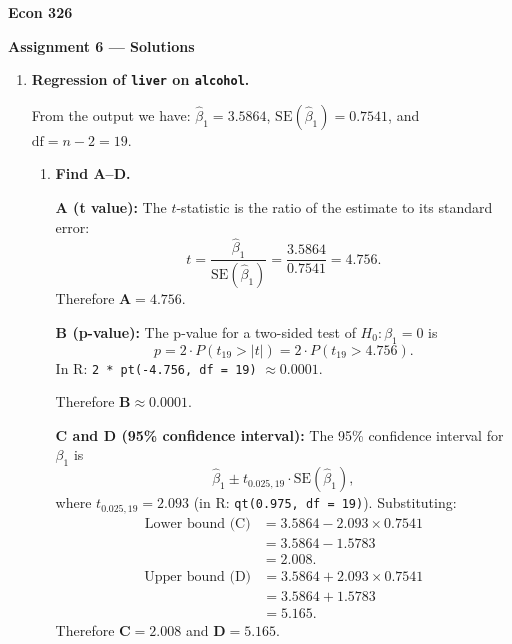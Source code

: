 \documentclass[12pt]{article}
\begin{document}
\begin{center}
\textbf{Econ 326}

\textbf{Assignment 6 --- Solutions}
\end{center}

\begin{enumerate}


\item \textbf{Regression of \texttt{liver} on \texttt{alcohol}.}

From the output we have: $\hat{\beta}_1 = 3.5864$, $\text{SE}(\hat{\beta}_1) = 0.7541$, and $\text{df} = n - 2 = 19$.

\begin{enumerate}

\item \textbf{Find A--D.}

\textbf{A (t value):} The $t$-statistic is the ratio of the estimate to its standard error:
$$
t = \frac{\hat{\beta}_1}{\text{SE}(\hat{\beta}_1)} = \frac{3.5864}{0.7541} = 4.756.
$$
Therefore $\mathbf{A = 4.756}$.

\bigskip

\textbf{B (p-value):} The p-value for a two-sided test of $H_0\colon \beta_1 = 0$ is
$$
p = 2 \cdot P(t_{19} > |t|) = 2 \cdot P(t_{19} > 4.756).
$$
In R: \verb!2 * pt(-4.756, df = 19)! $\approx 0.0001$.

Therefore $\mathbf{B \approx 0.0001}$.

\bigskip

\textbf{C and D (95\% confidence interval):} The 95\% confidence interval for $\beta_1$ is
$$
\hat{\beta}_1 \pm t_{0.025, 19} \cdot \text{SE}(\hat{\beta}_1),
$$
where $t_{0.025, 19} = 2.093$ (in R: \verb!qt(0.975, df = 19)!). Substituting:
\begin{align*}
\text{Lower bound (C)} &= 3.5864 - 2.093 \times 0.7541 \\
&= 3.5864 - 1.5783 \\
&= 2.008.
\end{align*}
\begin{align*}
\text{Upper bound (D)} &= 3.5864 + 2.093 \times 0.7541 \\
&= 3.5864 + 1.5783 \\
&= 5.165.
\end{align*}
Therefore $\mathbf{C = 2.008}$ and $\mathbf{D = 5.165}$.


\end{enumerate}
\end{enumerate}
\end{document}
